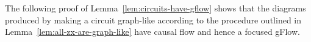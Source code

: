 \documentclass[a4paper,onecolumn,superscriptaddress,11pt,accepted=2020-04-27]{quantumarticle}
\newcommand{\CZ}{\ensuremath{\textrm{CZ}}\xspace}
\theoremstyle{definition}
\begin{document}

The following proof of Lemma~\ref{lem:circuits-have-gflow} shows that the diagrams produced by making a circuit graph-like according to the procedure outlined in Lemma~\ref{lem:all-zx-are-graph-like} have causal flow and hence a focused gFlow.
\end{document}

